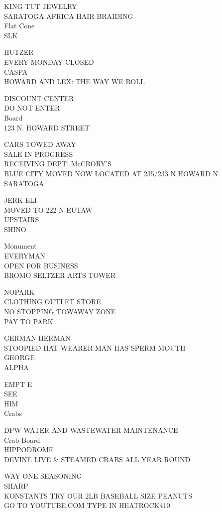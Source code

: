 \documentclass[10pt,letterpaper]{article}
\begin{document}
KING TUT JEWELRY\\
SARATOGA AFRICA HAIR BRAIDING\\
Flat Cone\\
SLK

HUTZER\\
EVERY MONDAY CLOSED\\
CASPA\\
HOWARD AND LEX: THE WAY WE ROLL

DISCOUNT CENTER\\
DO NOT ENTER\\
Board\\
123 N. HOWARD STREET

CARS TOWED AWAY\\
SALE IN PROGRESS\\
RECEIVING DEPT. McCRORY'S\\
BLUE CITY MOVED NOW LOCATED AT 235/233 N HOWARD N SARATOGA

JERK ELI\\
MOVED TO 222 N EUTAW\\
UPSTAIRS\\
SHINO

Monument\\
EVERYMAN\\
OPEN FOR BUSINESS\\
BROMO SELTZER ARTS TOWER

NOPARK\\
CLOTHING OUTLET STORE\\
NO STOPPING TOWAWAY ZONE\\
PAY TO PARK

GERMAN HERMAN\\
STOOPIED HAT WEARER MAN HAS SPERM MOUTH\\
GEORGE\\
ALPHA

EMPT E\\
SEE\\
HIM\\
Crabs

DPW WATER AND WASTEWATER MAINTENANCE\\
Crab Board\\
HIPPODROME\\
DEVINE LIVE \& STEAMED CRABS ALL YEAR ROUND

WAY ONE SEASONING\\
SHARP\\
KONSTANTS TRY OUR 2LB BASEBALL SIZE PEANUTS\\
GO TO YOUTUBE.COM TYPE IN HEATROCK410
\end{document}
